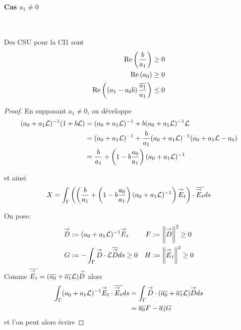       \paragraph{Cas \(a_1\not=0\)}
        ~
        \begin{prop}
          Des CSU pour la CI1 sont
          \begin{align}
            \operatorname{Re}\left(\dfrac{b}{a_1}\right) \ge 0 \\
            \operatorname{Re}\left(a_0\right) \ge 0 \\
            \operatorname{Re}\left(\left(a_1-a_0 b\right)\dfrac{{\overline{a_1}}}{a_1}\right) \le 0
          \end{align}
        \end{prop}
        \begin{proof}
          En supposant \(a_1 \not=0\), on développe 
          \begin{align*}
            (a_0 + a_1 \mathcal{L})^{-1}(1 + b \mathcal{L}) &= (a_0 + a_1 \mathcal{L})^{-1} + b (a_0 + a_1 \mathcal{L})^{-1}\mathcal{L}
            \\
            &=(a_0 + a_1 \mathcal{L})^{-1} + \dfrac{b}{a_1} (a_0 + a_1 \mathcal{L})^{-1}(a_0 + a_1\mathcal{L} -a_0)
            \\
            &=\dfrac{b}{a_1} + \left(1-b\dfrac{a_0}{a_1}\right)(a_0+a_1 \mathcal{L})^{-1}
          \end{align*}

          et ainsi
          \[
            X = \int_\Gamma \left(\left(\dfrac{b}{a_1}  + \left(1-b\dfrac{a_0}{a_1}\right)(a_0+a_1 \mathcal{L})^{-1}\right){\overset{\rightarrow}{E}}_t\right) \cdot {\overline{{\overset{\rightarrow}{E}}_t}} ds
          \]

          On pose:
          \begin{align*}
            {\overset{\rightarrow}{D}} &:= (a_0 + a_1 \mathcal{L})^{-1}{\overset{\rightarrow}{E}}_t & F&:= \left\lVert{\overset{\rightarrow}{D}}\right\rVert^2 \ge 0  
            \\
            G&:= -\int_\Gamma {\overset{\rightarrow}{D}} \cdot \mathcal{L}{\overline{{\overset{\rightarrow}{D}}}} ds \ge 0 & H &:= \left\lVert{\overset{\rightarrow}{E}}_t\right\rVert^2 \ge 0
          \end{align*}
          Comme \({\overline{{\overset{\rightarrow}{E}}_t}} = ({\overline{a_0}} + {\overline{a_1}}\mathcal{L}){\overset{\rightarrow}{D}}\) alors 
          \begin{align*}
            \int_\Gamma (a_0 +a_1 \mathcal{L}) ^{-1}{\overset{\rightarrow}{E}}_t\cdot {\overline{{\overset{\rightarrow}{E}}_t}} ds 
            &= \int_\Gamma {\overset{\rightarrow}{D}}\cdot ({\overline{a_0}} + {\overline{a_1}}\mathcal{L}){\overset{\rightarrow}{D}} ds 
            \\
            &= {\overline{a_0}} F - {\overline{a_1}} G
          \end{align*}
          et l'on peut alors écrire


\end{proof}
